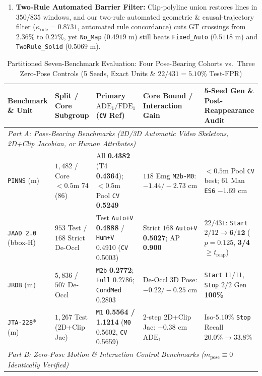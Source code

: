 \documentclass[journal]{IEEEtran}
\begin{document}
\begin{enumerate}
  \item \textbf{Two-Rule Automated Barrier Filter:} Clip-polyline union restores lines in $350 / 835$ windows, and our two-rule automated geometric \& causal-trajectory filter ($\kappa_{\text{rule}} = 0.8731$, automated rule concordance) cuts GT crossings from $2.36\%$ to $0.27\%$, yet \texttt{No\_Map} ($0.4919\text{ m}$) still beats \texttt{Fixed\_Auto} ($0.5118\text{ m}$) and \texttt{TwoRule\_Solid} ($0.5069\text{ m}$).
\end{enumerate}

\begin{table}[!t]
\centering
\caption{Partitioned Seven-Benchmark Evaluation: Four Pose-Bearing Cohorts vs.\ Three Zero-Pose Controls (5 Seeds, Exact Units \& $22/431 = 5.10\%$ Test-FPR)}
\label{tab:wave21_22}
\footnotesize
\begin{tabular}{lllll}
\toprule
Benchmark \& Unit & Split / Core Subgroup & Primary $\text{ADE}_1 / \text{FDE}_1$ (\texttt{CV} Ref) & Core Bound / Interaction Gain & 5-Seed Gen \& Post-Reappearance Audit \\
\midrule
\multicolumn{5}{l}{\textit{Part A: Pose-Bearing Benchmarks (2D/3D Automatic Video Skeletons, 2D+Clip Jacobian, or Human Attributes)}} \\
\texttt{PINNS} (m) & $1{,}482$ / Core $<0.5$m $74$ ($86$) & All \textbf{0.4382} (T4 \textbf{0.4364}); $<0.5$m Pool \texttt{CV} \textbf{0.5249} & $118$ Emg \texttt{M2b-M0}: \textbf{$-1.44 / -2.73\text{ cm}$} & $<0.5$m Pool \texttt{CV} best; $61$ Man \texttt{ES6} \textbf{$-1.69\text{ cm}$} \\
\texttt{JAAD 2.0} (bbox-H) & $953$ Test / $168$ Strict De-Occl & Test \texttt{Auto+V} \textbf{0.4888} / \texttt{Hum+V} 0.4910 (\texttt{CV} 0.5003) & Strict $168$ \texttt{Auto+V} \textbf{0.5027}; AP \textbf{0.900} & $22/431$: \texttt{Start} $2/12\to\textbf{6/12}$ ($p{=}0.125$, \textbf{3/4} $\ge t_{\text{reap}}$) \\
\texttt{JRDB} (m) & $5{,}836$ / $507$ De-Occl & \texttt{M2b} \textbf{0.2772}; \texttt{Full} 0.2786; \texttt{CondMed} 0.2803 & De-Occl 3D Pose: \textbf{$-0.22 / -0.25\text{ cm}$} & \texttt{Start} $11/11$, \texttt{Stop} $2/2$ Gen \textbf{100\%} \\
\texttt{JTA-228}* (m) & $1{,}267$ Test (2D+Clip Jac) & \texttt{M1} \textbf{0.5564 / 1.1214} (\texttt{M0} 0.5602, \texttt{CV} 0.5659) & 2-step 2D+Clip Jac: \textbf{$-0.38\text{ cm}$} $\text{ADE}_1$ & Iso-$5.10\%$ \texttt{Stop} Recall $20.0\% \to 33.8\%$ \\
\midrule
\multicolumn{5}{l}{\textit{Part B: Zero-Pose Motion \& Interaction Control Benchmarks ($m_{\text{pose}} \equiv 0$ Identically Verified)}} \\

\end{tabular}
\end{table}
\end{document}
